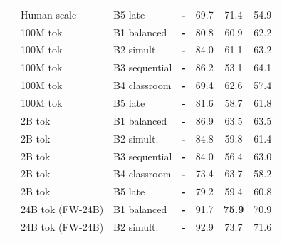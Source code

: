 \begin{table}[t]
\begin{minipage}[t]{0.49\linewidth}
\begin{tabular}{ll l cc cc}
 & Human-scale & B5 late & \textbf{-} & \cellcolor[rgb]{0.893,1.000,0.893} 69.7 & \cellcolor[rgb]{0.848,1.000,0.848} 71.4 & \cellcolor[rgb]{0.960,1.000,0.960} 54.9 \\
\addlinespace[1.5pt]
 & 100M tok & B1 balanced & \textbf{-} & \cellcolor[rgb]{0.832,1.000,0.832} 80.8 & \cellcolor[rgb]{0.923,1.000,0.923} 60.9 & \cellcolor[rgb]{0.900,1.000,0.900} 62.2 \\
 & 100M tok & B2 simult. & \textbf{-} & \cellcolor[rgb]{0.815,1.000,0.815} 84.0 & \cellcolor[rgb]{0.921,1.000,0.921} 61.1 & \cellcolor[rgb]{0.891,1.000,0.891} 63.2 \\
 & 100M tok & B3 sequential & \textbf{-} & \cellcolor[rgb]{0.803,1.000,0.803} 86.2 & \cellcolor[rgb]{0.978,1.000,0.978} 53.1 & \cellcolor[rgb]{0.884,1.000,0.884} 64.1 \\
 & 100M tok & B4 classroom & \textbf{-} & \cellcolor[rgb]{0.894,1.000,0.894} 69.4 & \cellcolor[rgb]{0.910,1.000,0.910} 62.6 & \cellcolor[rgb]{0.939,1.000,0.939} 57.4 \\
 & 100M tok & B5 late & \textbf{-} & \cellcolor[rgb]{0.828,1.000,0.828} 81.6 & \cellcolor[rgb]{0.938,1.000,0.938} 58.7 & \cellcolor[rgb]{0.903,1.000,0.903} 61.8 \\
\addlinespace[1.5pt]
 & 2B tok & B1 balanced & \textbf{-} & \cellcolor[rgb]{0.799,1.000,0.799} 86.9 & \cellcolor[rgb]{0.904,1.000,0.904} 63.5 & \cellcolor[rgb]{0.889,1.000,0.889} 63.5 \\
 & 2B tok & B2 simult. & \textbf{-} & \cellcolor[rgb]{0.810,1.000,0.810} 84.8 & \cellcolor[rgb]{0.930,1.000,0.930} 59.8 & \cellcolor[rgb]{0.906,1.000,0.906} 61.4 \\
 & 2B tok & B3 sequential & \textbf{-} & \cellcolor[rgb]{0.815,1.000,0.815} 84.0 & \cellcolor[rgb]{0.955,1.000,0.955} 56.4 & \cellcolor[rgb]{0.893,1.000,0.893} 63.0 \\
 & 2B tok & B4 classroom & \textbf{-} & \cellcolor[rgb]{0.872,1.000,0.872} 73.4 & \cellcolor[rgb]{0.903,1.000,0.903} 63.7 & \cellcolor[rgb]{0.932,1.000,0.932} 58.2 \\
 & 2B tok & B5 late & \textbf{-} & \cellcolor[rgb]{0.841,1.000,0.841} 79.2 & \cellcolor[rgb]{0.933,1.000,0.933} 59.4 & \cellcolor[rgb]{0.911,1.000,0.911} 60.8 \\
 \addlinespace[1.5pt]
 & 24B tok (FW-24B) & B1 balanced & \textbf{-} & \cellcolor[rgb]{0.773,1.000,0.773} 91.7 & \cellcolor[rgb]{0.826,1.000,0.826} \textbf{75.9} & \cellcolor[rgb]{0.840,1.000,0.840} 70.9 \\
 & 24B tok (FW-24B) & B2 simult. & \textbf{-} & \cellcolor[rgb]{0.767,1.000,0.767} 92.9 & \cellcolor[rgb]{0.838,1.000,0.838} 73.7 & \cellcolor[rgb]{0.836,1.000,0.836} 71.6 \\

\end{tabular}
\end{minipage}
\end{table}
